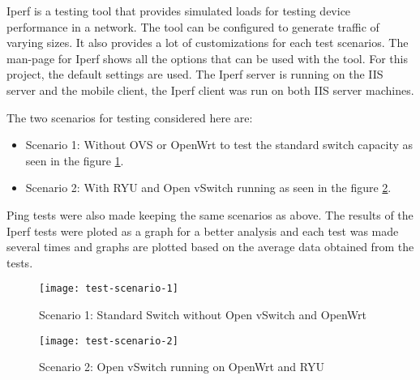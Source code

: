 Iperf is a testing tool that provides simulated loads for testing device performance in a network. The tool can be configured to generate traffic of varying sizes. It also provides a lot of customizations for each test scenarios. The man-page for Iperf shows all the options that can be used with the tool. For this project, the default settings are used. The Iperf server is running on the IIS server and the mobile client, the Iperf client was run on both IIS server machines.

The two scenarios for testing considered here are:
\begin{itemize}
	\item Scenario 1: Without OVS or OpenWrt to test the standard switch capacity as seen in the figure \ref{fig:test_scenario_1}. 
	\item Scenario 2: With RYU and Open vSwitch running as seen in the figure \ref{fig:test_scenario_2}.
\end{itemize}

Ping tests were also made keeping the same scenarios as above. The results of the Iperf tests were ploted as a graph for a better analysis and each test was made several times and graphs are plotted based on the average data obtained from the tests.

 \begin{figure}
	\centering
	\texttt{[image: test-scenario-1]}
	\caption {Scenario 1: Standard Switch without Open vSwitch and OpenWrt}
	\label{fig:test_scenario_1}
	\vspace{-10pt}
\end{figure}
\begin{figure}
	\centering
	\texttt{[image: test-scenario-2]}
	\caption {Scenario 2: Open vSwitch running on OpenWrt and RYU}
	\label{fig:test_scenario_2}
	\vspace{-10pt}
\end{figure}
%	
